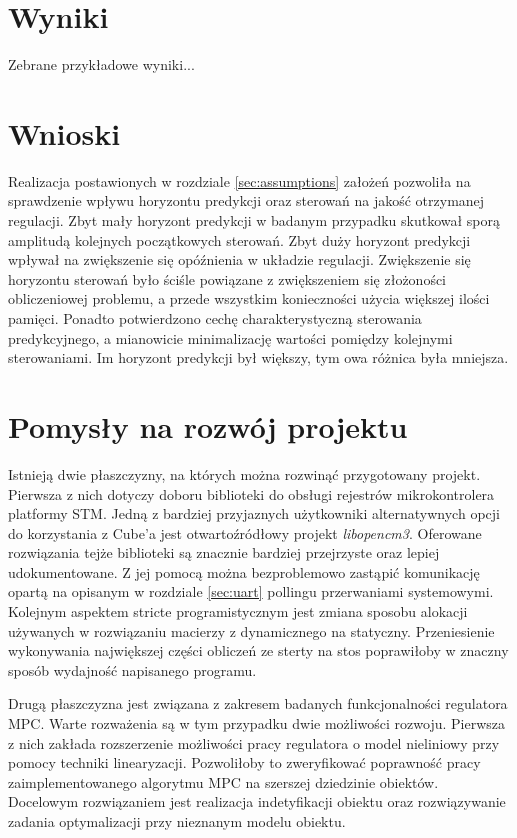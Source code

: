 \section{Wyniki}
Zebrane przykładowe wyniki...

\section{Wnioski}
Realizacja postawionych w rozdziale \ref{sec:assumptions} założeń pozwoliła na sprawdzenie
wpływu horyzontu predykcji oraz sterowań na jakość otrzymanej regulacji. Zbyt mały horyzont
predykcji w badanym przypadku skutkował sporą amplitudą kolejnych początkowych sterowań. Zbyt
duży horyzont predykcji wpływał na zwiększenie się opóźnienia w układzie regulacji. Zwiększenie się
horyzontu sterowań było ściśle powiązane z zwiększeniem się złożoności obliczeniowej problemu,
a przede wszystkim konieczności użycia większej ilości pamięci.
Ponadto potwierdzono cechę charakterystyczną sterowania predykcyjnego, a mianowicie minimalizację
wartości pomiędzy kolejnymi sterowaniami. Im horyzont predykcji był większy, tym owa różnica
była mniejsza.

\section{Pomysły na rozwój projektu}
Istnieją dwie płaszczyzny, na których można rozwinąć przygotowany projekt. Pierwsza z nich dotyczy
doboru biblioteki do obsługi rejestrów mikrokontrolera platformy STM. Jedną z bardziej przyjaznych
użytkowniki alternatywnych opcji do korzystania z Cube'a jest otwartoźródłowy projekt
\textit{libopencm3}. Oferowane rozwiązania tejże biblioteki są znacznie bardziej przejrzyste
oraz lepiej udokumentowane. Z jej pomocą można bezproblemowo zastąpić komunikację opartą na
opisanym w rozdziale \ref{sec:uart} pollingu przerwaniami systemowymi. Kolejnym aspektem
stricte programistycznym jest zmiana sposobu alokacji używanych w rozwiązaniu macierzy z
dynamicznego na statyczny. Przeniesienie wykonywania największej części obliczeń ze sterty
na stos poprawiłoby w znaczny sposób wydajność napisanego programu.

Drugą płaszczyzna jest związana z zakresem badanych funkcjonalności regulatora MPC. Warte
rozważenia są w tym przypadku dwie możliwości rozwoju. Pierwsza z nich zakłada rozszerzenie
możliwości pracy regulatora o model nieliniowy przy pomocy techniki linearyzacji. Pozwoliłoby
to zweryfikować poprawność pracy zaimplementowanego algorytmu MPC na szerszej dziedzinie
obiektów. Docelowym rozwiązaniem jest realizacja indetyfikacji obiektu oraz rozwiązywanie
zadania optymalizacji przy nieznanym modelu obiektu. 